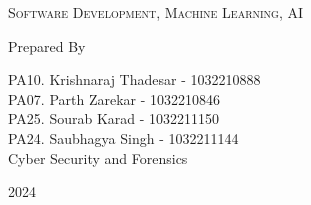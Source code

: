 \documentclass[11pt]{article}
\begin{document}
\begin{titlepage}

    \LARGE\textsc{
        Software Development, Machine Learning, AI\\
    } %
    \vfill


    Prepared By
    \vspace{0.5\baselineskip} %

    \Large{
        PA10. Krishnaraj Thadesar - 1032210888\\
        PA07. Parth Zarekar - 1032210846\\
        PA25. Sourab Karad - 1032211150\\
        PA24. Saubhagya Singh - 1032211144\\
        Cyber Security and Forensics\\
    }


    \vspace{0.5\baselineskip} %
    2024

\end{titlepage}


\tableofcontents
\thispagestyle{empty}
\clearpage
\end{document}

